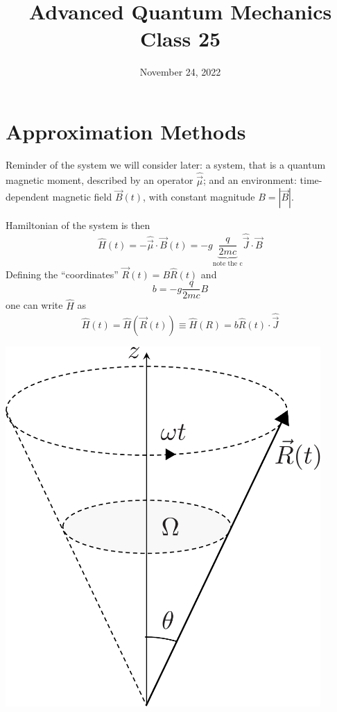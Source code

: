 \documentclass[12pt]{article}
\title{Advanced Quantum Mechanics\\Class 25}
\date{November 24, 2022}                                           %
\newcommand{\be}{\begin{equation}}
\newcommand{\ee}{\end{equation}}
\begin{document}
\maketitle

\setcounter{section}{6}

\section{Approximation Methods}

Reminder of the system we will consider later:
a system, that is a quantum magnetic moment,
 described by an operator $\hat{\vec{\mu}}$;
and an environment: time-dependent magnetic field
$\vec{B}(t)$, with constant magnitude $B=|\vec{B}|$.

\begin{minipage}{0.6\textwidth}
\setcounter{equation}{77}
Hamiltonian of the system is then
\be
\hat{H}(t)=-\hat{\vec{\mu}} \cdot \vec{B}(t)=-g \underbrace{\frac{q}{2 m c}}_{\text{note the c}} \hat{\vec{J}} \cdot \vec{B}
\ee	
Defining the ``coordinates'' $\vec{R}(t)=B \hat{R}(t)$ and
\be
b=-g \frac{q}{2 m c} B
\ee
one can write $\hat{H}$ as
\be
\hat{H}(t)=\hat{H}(\vec{R}(t)) \equiv \hat{H}(R)=b \hat{R}(t) \cdot \hat{\vec{J}}
\label{eq:g80}
\ee
\end{minipage}%
\begin{minipage}{0.4\textwidth}
\hfill\includegraphics[width=0.9\textwidth]{Figures/RotatingVector-crop.pdf}
\end{minipage}
\end{document}
